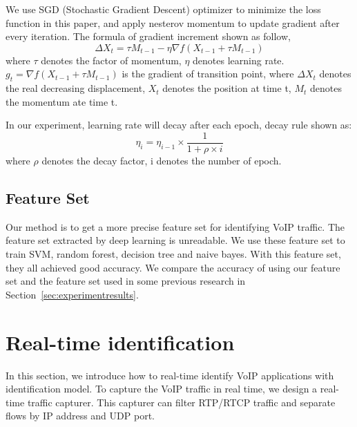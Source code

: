 \documentclass[conference]{IEEEtran}
\begin{document}
We use SGD (Stochastic Gradient Descent) optimizer to minimize the loss function in this paper, and apply nesterov momentum to update gradient after every iteration. The formula of gradient increment shown as follow,
\begin{equation}
\Delta {X_t} = \tau {M_{t - 1}} - \eta \nabla f({X_{t - 1}} + \tau {M_{t - 1}})
\end{equation}
where ${\tau}$ denotes the factor of momentum, ${\eta}$ denotes learning rate. ${g_t} = \nabla f({X_{t - 1}} + \tau {M_{t - 1}})$ is the gradient of transition point, where $\Delta {X_t}$ denotes the real decreasing displacement, ${X_t}$ denotes the position at time t, ${M_t}$ denotes the momentum ate time t.

In our experiment, learning rate will decay after each epoch, decay rule shown as:
\begin{equation}
{\eta _i} = {\eta _{i - 1}} \times \frac{1}{{1 + \rho  \times i}}
\end{equation}
where ${\rho }$ denotes the decay factor, i denotes the number of epoch.

\subsection{Feature Set}
Our method is to get a more precise feature set for identifying VoIP traffic. The feature set extracted by deep learning is unreadable. We use these feature set to train SVM, random forest, decision tree and naive bayes. With this feature set, they all achieved good accuracy. We compare the accuracy of using our feature set and the feature set used in some previous research in Section~\ref{sec:experimentresults}.

\section{Real-time identification}
\label{sec:realtimeidentification}
In this section, we introduce how to real-time identify VoIP applications with identification model. To capture the VoIP traffic in real time, we design a real-time traffic capturer. This capturer can filter RTP/RTCP traffic and separate flows by IP address and UDP port.
\end{document}
